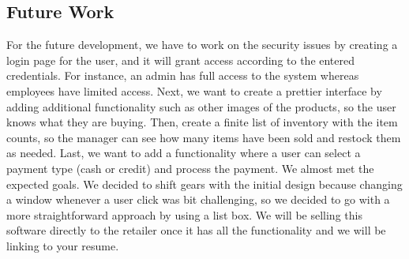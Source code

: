\documentclass[10pt,conference,onecolumn,compsoc]{IEEEtran}
\begin{document}
\subsection{Future Work}
For the future development, we have to work on the security issues by creating a login page for the user, and it will grant access according to the entered credentials. For instance, an admin has full access to the system whereas employees have limited access. Next, we want to create a prettier interface by adding additional functionality such as other images of the products, so the user knows what they are buying. Then, create a finite list of inventory with the item counts, so the manager can see how many items have been sold and restock them as needed. Last, we want to add a functionality where a user can select a payment type (cash or credit) and process the payment.
We almost met the expected goals. We decided to shift gears with the initial design because changing a window whenever a user click was bit challenging, so we decided to go with a more straightforward approach by using a list box. We will be selling this software directly to the retailer once it has all the functionality and we will be linking to your resume. 






%
\end{document}
